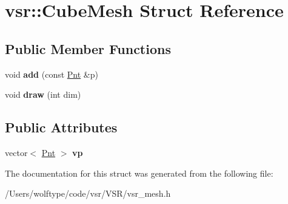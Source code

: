 \hypertarget{structvsr_1_1_cube_mesh}{\section{vsr\-:\-:Cube\-Mesh Struct Reference}
\label{structvsr_1_1_cube_mesh}
}
\subsection*{Public Member Functions}
\begin{DoxyCompactItemize}
\item 
\hypertarget{structvsr_1_1_cube_mesh_a696f10ac4bf191a5f6e5e74313b54801}{void {\bfseries add} (const \hyperlink{namespacevsr_a2d05beb9721c5d9211b479af6d47222d}{Pnt} \&p)}\label{structvsr_1_1_cube_mesh_a696f10ac4bf191a5f6e5e74313b54801}

\item 
\hypertarget{structvsr_1_1_cube_mesh_a4310eeeb16aa84226bec46918fd64969}{void {\bfseries draw} (int dim)}\label{structvsr_1_1_cube_mesh_a4310eeeb16aa84226bec46918fd64969}

\end{DoxyCompactItemize}
\subsection*{Public Attributes}
\begin{DoxyCompactItemize}
\item 
\hypertarget{structvsr_1_1_cube_mesh_af33d7120263bb73f46d5443f7beed757}{vector$<$ \hyperlink{namespacevsr_a2d05beb9721c5d9211b479af6d47222d}{Pnt} $>$ {\bfseries vp}}\label{structvsr_1_1_cube_mesh_af33d7120263bb73f46d5443f7beed757}

\end{DoxyCompactItemize}


The documentation for this struct was generated from the following file\-:\begin{DoxyCompactItemize}
\item 
/\-Users/wolftype/code/vsr/\-V\-S\-R/vsr\-\_\-mesh.\-h\end{DoxyCompactItemize}
